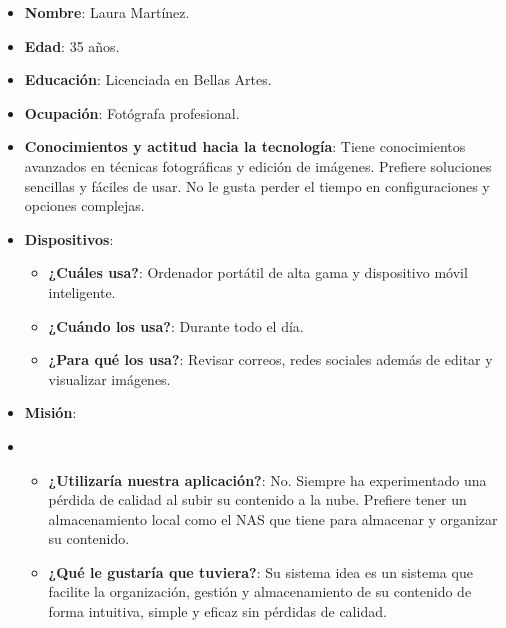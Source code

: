     \begin{itemize}
        \item \textbf{Nombre}: Laura Martínez.
        \item \textbf{Edad}: 35 años.
        \item \textbf{Educación}: Licenciada en Bellas Artes.
        \item \textbf{Ocupación}: Fotógrafa profesional.
        \item \textbf{Conocimientos y actitud hacia la tecnología}: Tiene conocimientos avanzados en técnicas fotográficas y edición de imágenes. Prefiere soluciones sencillas y fáciles de usar. No le gusta perder el tiempo en configuraciones y opciones complejas.
        \item \textbf{Dispositivos}:
            \begin{itemize}

            \item \textbf{¿Cuáles usa?}: Ordenador portátil de alta gama y dispositivo móvil inteligente.
            \item \textbf{¿Cuándo los usa?}: Durante todo el día.
            \item \textbf{¿Para qué los usa?}: Revisar correos, redes sociales además de editar y visualizar imágenes.

            \end{itemize}
        \item \textbf{Misión}:
        \item 
            \begin{itemize}

                \item \textbf{¿Utilizaría nuestra aplicación?}: No. Siempre ha experimentado una pérdida de calidad al subir su contenido a la nube. Prefiere tener un almacenamiento local como el NAS que tiene para almacenar y organizar su contenido.

                \item \textbf{¿Qué le gustaría que tuviera?}: Su sistema idea es un sistema que facilite la organización, gestión y almacenamiento de su contenido de forma intuitiva, simple y eficaz sin pérdidas de calidad.

            \end{itemize}
        
    \end{itemize}

